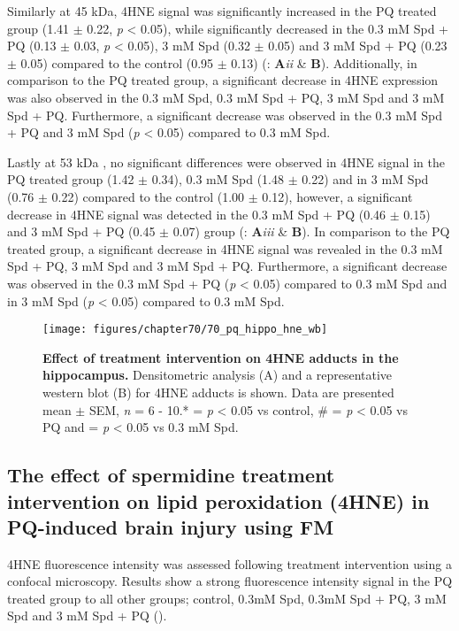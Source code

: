 Similarly at 45 kDa, 4HNE signal was significantly increased in the PQ treated group (1.41 $\pm$ 0.22, \textit{p} < 0.05), while significantly decreased in the 0.3 mM Spd + PQ (0.13 $\pm$ 0.03, \textit{p} < 0.05), 3 mM Spd (0.32 $\pm$ 0.05) and 3 mM Spd + PQ (0.23 $\pm$ 0.05) compared to the control (0.95 $\pm$ 0.13) (: \textbf{A}\textit{ii} \& \textbf{B}). Additionally, in comparison to the PQ treated group, a significant decrease in 4HNE expression was also observed in the 0.3 mM Spd, 0.3 mM Spd + PQ, 3 mM Spd and 3 mM Spd + PQ. Furthermore, a significant decrease was observed in the 0.3 mM Spd + PQ and 3 mM Spd (\textit{p} < 0.05) compared to 0.3 mM Spd.

Lastly at 53 kDa , no significant differences were observed in 4HNE signal in the PQ treated group (1.42 $\pm$ 0.34), 0.3 mM Spd (1.48 $\pm$ 0.22) and in 3 mM Spd (0.76 $\pm$ 0.22) compared to the control (1.00 $\pm$ 0.12), however, a significant decrease in 4HNE signal was detected in the 0.3 mM Spd + PQ (0.46 $\pm$ 0.15) and 3 mM Spd + PQ (0.45 $\pm$ 0.07) group (: \textbf{A}\textit{iii} \& \textbf{B}). In comparison to the PQ treated group, a significant decrease in 4HNE signal was revealed in the 0.3 mM Spd + PQ, 3 mM Spd and 3 mM Spd + PQ. Furthermore, a significant decrease was observed in the 0.3 mM Spd + PQ (\textit{p} < 0.05) compared to 0.3 mM Spd and in 3 mM Spd (\textit{p} < 0.05) compared to 0.3 mM Spd. 

\begin{landscape}
\begin{figure}[!htbp]
\center
  \texttt{[image: figures/chapter70/70\_pq\_hippo\_hne\_wb]}
  \caption[Effect of treatment intervention on 4HNE adducts in the hippocampus]{\textbf{Effect of treatment intervention on 4HNE adducts in the hippocampus.} Densitometric analysis (A) and a representative western blot (B) for 4HNE adducts is shown. Data are presented  mean $\pm$ SEM, \textit{n} = 6 - 10.* = \textit{p} < 0.05 vs control, \# = \textit{p} < 0.05 vs PQ and \@ = \textit{p} < 0.05 vs 0.3 mM Spd.}
  \label{fig:70_pq_hippo_hne_wb}
\end{figure} 
\end{landscape}

\subsection{The effect of spermidine treatment intervention on lipid peroxidation (4HNE) in PQ-induced brain injury using FM}
4HNE fluorescence intensity was assessed following treatment intervention using a confocal microscopy. Results show a strong fluorescence intensity signal in the PQ treated group to all other groups; control, 0.3mM Spd, 0.3mM Spd + PQ, 3 mM Spd and 3 mM Spd + PQ ().

